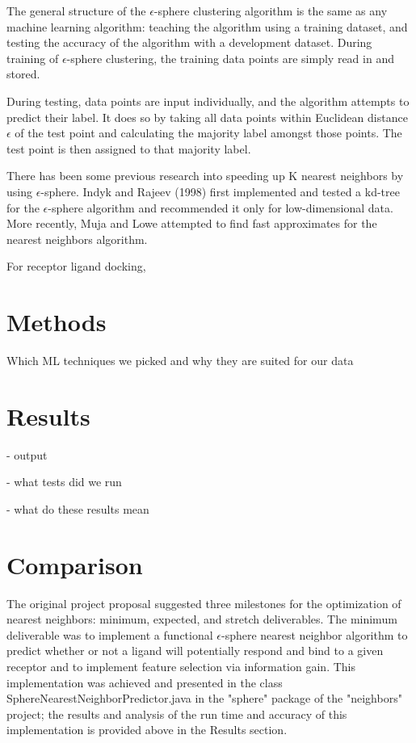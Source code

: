 \documentclass[11pt,letterpaper]{article}
\begin{document}
The general structure of the $\epsilon$-sphere clustering algorithm is the same as any machine learning algorithm: teaching the algorithm using a training dataset, and testing the accuracy of the algorithm with a development dataset. During training of $\epsilon$-sphere clustering, the training data points are simply read in and stored. 

During testing, data points are input individually, and the algorithm attempts to predict their label. It does so by taking all data points within Euclidean distance $\epsilon$ of the test point and calculating the majority label amongst those points. The test point is then assigned to that majority label.

There has been some previous research into speeding up K nearest neighbors by using $\epsilon$-sphere. Indyk and Rajeev (1998) first implemented and tested a kd-tree for the $\epsilon$-sphere algorithm and recommended it only for low-dimensional data. More recently, Muja and Lowe attempted to find fast approximates for the nearest neighbors algorithm.

For receptor ligand docking, 


\section{Methods}

Which ML techniques we picked and why they are suited for our data

\section{Results}
- output

- what tests did we run

- what do these results mean

\section{Comparison}

The original project proposal suggested three milestones for the optimization of nearest neighbors: minimum, expected, and stretch deliverables. The minimum deliverable was to implement a functional $\epsilon$-sphere nearest neighbor algorithm to predict whether or not a ligand will potentially respond and bind to a given receptor and to implement feature selection via information gain. This implementation was achieved and presented in the class SphereNearestNeighborPredictor.java in the "sphere" package of the "neighbors" project; the results and analysis of the run time and accuracy of this implementation is provided above in the Results section.
\end{document}
